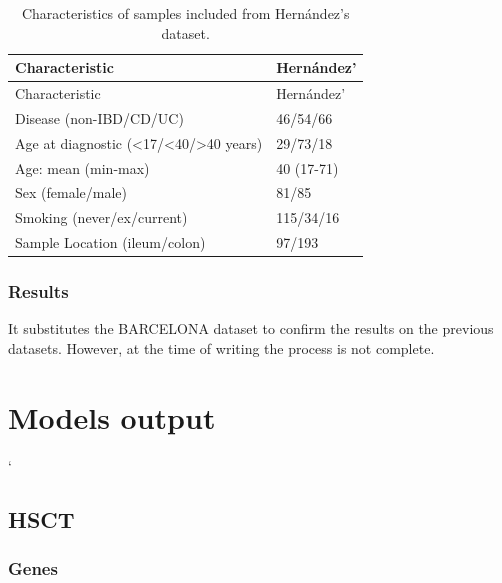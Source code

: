 \documentclass[
  12pt,
  a4paper,
  twoside,
  openright]{book}
\begin{document}
\begin{longtable}[]{@{}ll@{}}
\caption{\label{tab:hernandez} Characteristics of samples included from Hernández's dataset.}\tabularnewline
\toprule
Characteristic & Hernández' \\
\midrule
\endfirsthead
\toprule
Characteristic & Hernández' \\
\midrule
\endhead
Disease (non-IBD/CD/UC) & 46/54/66 \\
Age at diagnostic (\textless17/\textless40/\textgreater40 years) & 29/73/18 \\
Age: mean (min-max) & 40 (17-71) \\
Sex (female/male) & 81/85 \\
Smoking (never/ex/current) & 115/34/16 \\
Sample Location (ileum/colon) & 97/193 \\
\bottomrule
\end{longtable}

\hypertarget{results-hernandez}{%
\subsection{Results}\label{results-hernandez}}

It substitutes the BARCELONA dataset to confirm the results on the previous datasets.
However, at the time of writing the process is not complete.

\hypertarget{models-output}{%
\chapter{Models output}\label{models-output}}

`

\hypertarget{hsct}{%
\section{HSCT}\label{hsct}}

\hypertarget{genes}{%
\subsection{Genes}\label{genes}}
\end{document}
